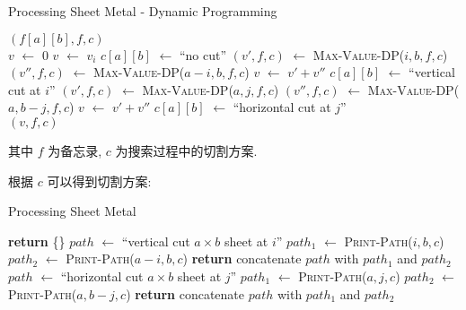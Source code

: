 \documentclass{ctexart}
\newcommand{\Let}[1]{\State #1 $\gets$}
\newcommand{\F}[2]{\textsc{#1}(#2)}
\newcommand{\Ret}[1]{\State \textbf{return} #1}
\begin{document}
\begin{algorithm}[H]
    \caption{Processing Sheet Metal - Dynamic Programming}
    \begin{algorithmic}
            \Ret $(f[a][b], f, c)$
        \EndIf
        \\

        \Let{$v$} $0$
            \Let{$v$} $v_i$
            \Let{$c[a][b]$} ``no cut''
        \EndIf
            \Let{$(v', f, c)$} \F{Max-Value-DP}{$i, b, f, c$}
            \Let{$(v'', f, c)$} \F{Max-Value-DP}{$a-i, b, f, c$}
                \Let{$v$} $v' + v''$
                \Let{$c[a][b]$} ``vertical cut at $i$''
            \EndIf
        \EndFor
            \Let{$(v', f, c)$} \F{Max-Value-DP}{$a, j, f, c$}
            \Let{$(v'', f, c)$} \F{Max-Value-DP}{$a, b-j, f, c$}
                \Let{$v$} $v' + v''$
                \Let{$c[a][b]$} ``horizontal cut at $j$''
            \EndIf
        \EndFor
        \\
        \Ret $(v, f, c)$
        \EndFunction
    \end{algorithmic}
\end{algorithm}

其中 $f$ 为备忘录, $c$ 为搜索过程中的切割方案.

根据 $c$ 可以得到切割方案:

\begin{algorithm}[H]
    \caption{Processing Sheet Metal}
    \begin{algorithmic}
            \Ret \{\}
            \Let{$path$} ``vertical cut $a\times b$ sheet at $i$''
            \Let{$path_1$} \F{Print-Path}{$i, b, c$}
            \Let{$path_2$} \F{Print-Path}{$a-i, b, c$}
            \Ret concatenate $path$ with $path_1$ and $path_2$
            \Let{$path$} ``horizontal cut $a\times b$ sheet at $j$''
            \Let{$path_1$} \F{Print-Path}{$a, j, c$}
            \Let{$path_2$} \F{Print-Path}{$a, b-j, c$}
            \Ret concatenate $path$ with $path_1$ and $path_2$
        \EndIf
        \EndFunction
    \end{algorithmic}
\end{algorithm}
\end{document}
